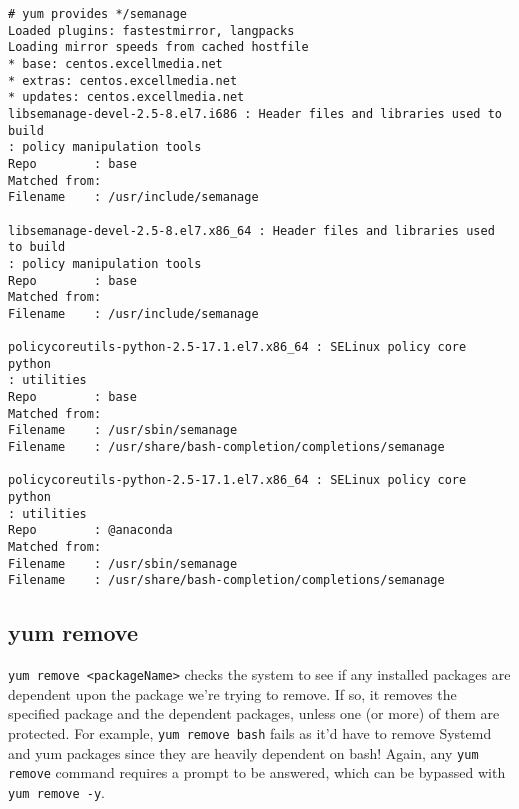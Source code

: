 \vspace{-15pt}
\begin{verbatim}
# yum provides */semanage
Loaded plugins: fastestmirror, langpacks
Loading mirror speeds from cached hostfile
* base: centos.excellmedia.net
* extras: centos.excellmedia.net
* updates: centos.excellmedia.net
libsemanage-devel-2.5-8.el7.i686 : Header files and libraries used to build
: policy manipulation tools
Repo        : base
Matched from:
Filename    : /usr/include/semanage

libsemanage-devel-2.5-8.el7.x86_64 : Header files and libraries used to build
: policy manipulation tools
Repo        : base
Matched from:
Filename    : /usr/include/semanage	

policycoreutils-python-2.5-17.1.el7.x86_64 : SELinux policy core python
: utilities
Repo        : base
Matched from:
Filename    : /usr/sbin/semanage
Filename    : /usr/share/bash-completion/completions/semanage	

policycoreutils-python-2.5-17.1.el7.x86_64 : SELinux policy core python
: utilities
Repo        : @anaconda
Matched from:
Filename    : /usr/sbin/semanage
Filename    : /usr/share/bash-completion/completions/semanage
\end{verbatim}
\vspace{-10pt}

\subsection{yum remove}
\verb|yum remove <packageName>| checks the system to see if any installed packages are dependent upon the package we're trying to remove. If so, it removes the specified package and the dependent packages, unless one (or more) of them are protected. For example, \verb|yum remove bash| fails as it'd have to remove Systemd and yum packages since they are heavily dependent on bash! Again, any \verb|yum remove| command requires a prompt to be answered, which can be bypassed with \verb|yum remove -y|. 

